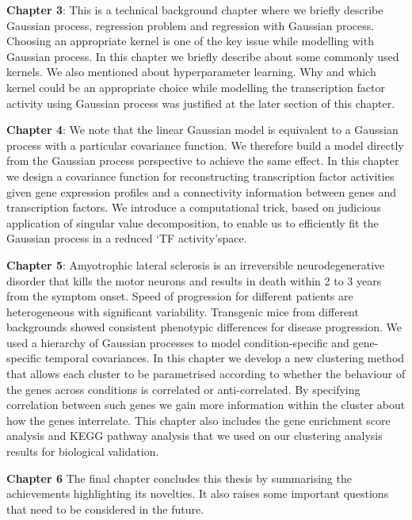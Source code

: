 \textbf{Chapter 3}:
This is a technical background chapter where we briefly describe Gaussian process, regression problem and regression with Gaussian process. Choosing an appropriate kernel is one of the key issue while modelling with Gaussian process. In this chapter we briefly describe about some commonly used kernels. We also mentioned about hyperparameter learning. Why and which kernel could be an appropriate choice while modelling the transcription factor activity using Gaussian process was justified at the later section of this chapter.

\textbf{Chapter 4}:
We note that the linear Gaussian model is equivalent to a Gaussian process with a particular covariance function. We therefore build a model directly from the Gaussian process perspective to achieve the same 
effect. In this chapter we design a covariance function for reconstructing transcription factor activities given gene expression profiles and a connectivity information between genes and transcription factors. We introduce a computational trick, based on  judicious application of singular value decomposition, to enable us to efficiently fit the Gaussian process in a reduced \lq TF activity\rq space. 

\textbf{Chapter 5}:
Amyotrophic lateral sclerosis is an irreversible neurodegenerative disorder that kills the motor neurons and results in death within 2 to 3 years from the symptom onset.  Speed of progression for different patients are heterogeneous with significant variability. Transgenic mice from different backgrounds showed consistent phenotypic differences for disease progression. We used a hierarchy of Gaussian processes to model condition-specific and gene-specific temporal covariances. In this chapter we develop a new clustering method that allows each cluster to be parametrised according to whether the behaviour of the genes across conditions is correlated or anti-correlated. By specifying correlation between such genes we gain more information within the cluster about how the genes interrelate. This chapter also includes the gene enrichment score analysis and KEGG pathway analysis that we used on our clustering analysis results for biological validation.

\textbf{Chapter 6}
The final chapter concludes this thesis by summarising the achievements highlighting its novelties. It also raises some important questions that need to be considered in the future.

% 

